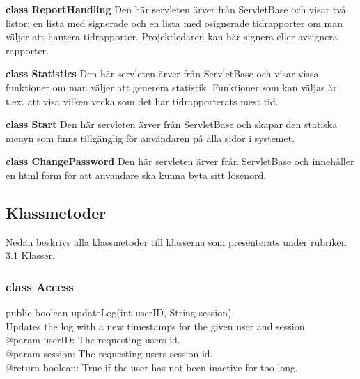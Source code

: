 \documentclass[a4paper]{article}
\begin{document}
\vspace{5mm}
\begin{hangparas}{1.5em}{1}
\textbf{class ReportHandling} Den här servleten ärver från ServletBase och visar två listor; en lista med signerade och en lista med osignerade tidrapporter om man väljer att hantera tidrapporter. Projektledaren kan här signera eller avsignera rapporter.
\end{hangparas}

\vspace{5mm}
\begin{hangparas}{1.5em}{1}
\textbf{class Statistics} Den här servleten ärver från ServletBase och visar vissa funktioner om man väljer att generera statistik. Funktioner som kan väljas är t.ex. att visa vilken vecka som det har tidrapporterats mest tid. 
\end{hangparas}

\vspace{5mm}
\begin{hangparas}{1.5em}{1}
\textbf{class Start} Den här servleten ärver från ServletBase och skapar den statiska menyn som finns tillgänglig för användaren på alla sidor i systemet.
\end{hangparas}


\vspace{5mm}
\begin{hangparas}{1.5em}{1}
\textbf{class ChangePassword} Den här servleten ärver från ServletBase och innehåller en html form för att användare ska kunna byta sitt lösenord.\\
\end{hangparas}

\subsection{Klassmetoder}
Nedan beskrivs alla klassmetoder till klasserna som presenterats under rubriken 3.1 Klasser.

\subsubsection{class Access}

\begin{hangparas}{1.5em}{1}
public boolean updateLog(int userID, String session)\\
Updates the log with a new timestamps for the given user and session. \\
@param userID: The requesting users id.\\
@param session: The requesting users session id.\\
@return boolean: True if the user has not been inactive for too long.
\end{hangparas}
\end{document}

